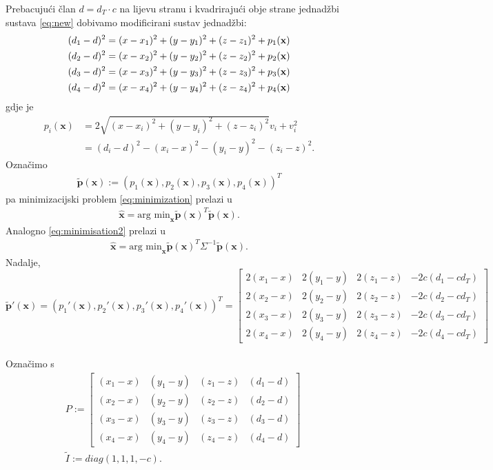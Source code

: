 \documentclass[a4paper,twoside,12pt]{memoir} %
\begin{document}
Prebacujući član $d=d_T \cdot c$ na lijevu stranu i kvadrirajući obje strane
jednadžbi sustava \ref{eq:new} dobivamo modificirani sustav jednadžbi:
\begin{align}\label{eq:newIzvedba}
(d_1-d)^2 = (x-x_1)^{2}+(y-y_1)^{2}+(z-z_1)^{2} + p_1(\textbf{x})\notag \\
(d_2-d)^2 = (x-x_2)^{2}+(y-y_2)^{2}+(z-z_2)^{2} + p_2(\textbf{x})\\
(d_3-d)^2 = (x-x_3)^{2}+(y-y_3)^{2}+(z-z_3)^{2} + p_3(\textbf{x})\notag \\
(d_4-d)^2 = (x-x_4)^{2}+(y-y_4)^{2}+(z-z_4)^{2} + p_4(\textbf{x})\notag
\end{align}
gdje je 
\begin{align*}
p_i(\textbf{x}) & = 2\sqrt{(x-x_i)^{2}+(y-y_i)^{2}+(z-z_i)^{2}}v_i + v_i^2 \\
& = (d_i-d)^2 - (x_i-x)^{2} - (y_i-y)^{2} - (z_i-z)^{2}.
\end{align*}
Označimo 
\begin{align*} \mathbf{\tilde{p}}(\mathbf{x}) := (p_1(\textbf{x}),p_2(\textbf{x}),p_3(\textbf{x}),p_4(\textbf{x}))^T
\end{align*}
pa minimizacijski problem \ref{eq:minimization} prelazi u
\begin{align}\label{eq:minimisation3}
\hat{\mathbf{x}} = \text{arg min}_\mathbf{x} \mathbf{\tilde{p}}(\mathbf{x})^T\mathbf{\tilde{p}}(\mathbf{x}).
\end{align}
Analogno \ref{eq:minimisation2} prelazi u 
\begin{align}\label{eq:minimisation4}
\hat{\mathbf{x}} = \text{arg min}_\mathbf{x} \mathbf{\tilde{p}}(\mathbf{x})^T \Sigma ^{-1}\mathbf{\tilde{p}}(\mathbf{x}).
\end{align}
\vspace{0.5cm}
Nadalje, $$ \mathbf{\tilde{p}'}(\mathbf{x}) = (p_1'(\textbf{x}),p_2'(\textbf{x}),p_3'(\textbf{x}),p_4'(\textbf{x}))^T 
= \begin{bmatrix}
2(x_1-x) &  2(y_1-y) &  2(z_1-z) & - 2c(d_1-cd_T)\\
2(x_2-x) &  2(y_2-y) &  2(z_2-z) & - 2c(d_2-cd_T) \\
2(x_3-x) &  2(y_3-y) &  2(z_3-z) & - 2c(d_3-cd_T) \\
2(x_4-x) &  2(y_4-y) &  2(z_4-z) & - 2c(d_4-cd_T) 
\end{bmatrix}
$$
\\Označimo s 
\begin{align*}
& P := \begin{bmatrix}
(x_1-x) & (y_1-y) & (z_1-z) & (d_1-d) \\
(x_2-x) & (y_2-y) & (z_2-z) & (d_2-d) \\
(x_3-x) & (y_3-y) & (z_3-z) & (d_3-d) \\
(x_4-x) & (y_4-y) & (z_4-z) & (d_4-d) 
\end{bmatrix} \\
& \tilde{I} := diag(1,1,1,-c).
\end{align*}
\end{document}
